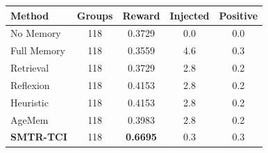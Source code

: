 \begin{tabular}{lcccc}
\toprule
Method & Groups & Reward & Injected & Positive \\
\midrule
No Memory & 118 & 0.3729 & 0.0 & 0.0 \\
Full Memory & 118 & 0.3559 & 4.6 & 0.3 \\
Retrieval & 118 & 0.3729 & 2.8 & 0.2 \\
Reflexion & 118 & 0.4153 & 2.8 & 0.2 \\
Heuristic & 118 & 0.4153 & 2.8 & 0.2 \\
AgeMem & 118 & 0.3983 & 2.8 & 0.2 \\
\textbf{SMTR-TCI} & 118 & \textbf{0.6695} & 0.3 & 0.3 \\
\bottomrule
\end{tabular}
